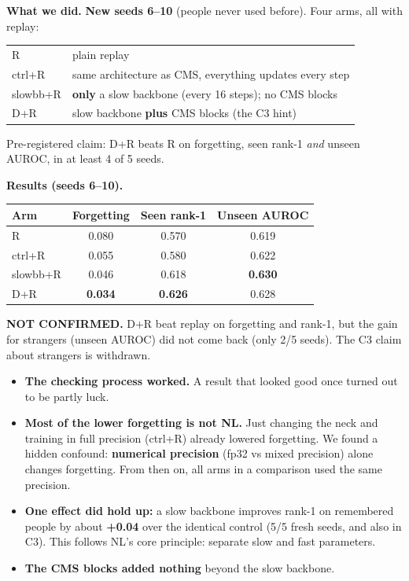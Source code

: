 \documentclass[11pt,a4paper]{article}
\begin{document}
\textbf{What we did.} \textbf{New seeds 6--10} (people never used before). Four arms, all with replay:
\begin{center}
\begin{tabular}{@{}ll@{}}
\toprule
R & plain replay\\
ctrl+R & same architecture as CMS, everything updates every step\\
slowbb+R & \textbf{only} a slow backbone (every 16 steps); no CMS blocks\\
D+R & slow backbone \textbf{plus} CMS blocks (the C3 hint)\\
\bottomrule
\end{tabular}
\end{center}
Pre-registered claim: D+R beats R on forgetting, seen rank-1 \emph{and} unseen AUROC, in at least 4 of 5 seeds.

\textbf{Results (seeds 6--10).}
\begin{center}
\begin{tabular}{@{}lccc@{}}
\toprule
\textbf{Arm} & \textbf{Forgetting} & \textbf{Seen rank-1} & \textbf{Unseen AUROC}\\
\midrule
R & 0.080 & 0.570 & 0.619\\
ctrl+R & 0.055 & 0.580 & 0.622\\
slowbb+R & 0.046 & 0.618 & \textbf{0.630}\\
D+R & \textbf{0.034} & \textbf{0.626} & 0.628\\
\bottomrule
\end{tabular}
\end{center}

\begin{verdict}
\textbf{NOT CONFIRMED.} D+R beat replay on forgetting and rank-1, but the gain for strangers (unseen AUROC) did not come back (only 2/5 seeds). The C3 claim about strangers is withdrawn.
\end{verdict}

\begin{means}
\begin{itemize}[leftmargin=1.2em]
  \item \textbf{The checking process worked.} A result that looked good once turned out to be partly luck.
  \item \textbf{Most of the lower forgetting is not NL.} Just changing the neck and training in full precision (ctrl+R) already lowered forgetting. We found a hidden confound: \textbf{numerical precision} (fp32 vs mixed precision) alone changes forgetting. From then on, all arms in a comparison used the same precision.
  \item \textbf{One effect did hold up:} a slow backbone improves rank-1 on remembered people by about \textbf{+0.04} over the identical control (5/5 fresh seeds, and also in C3). This follows NL's core principle: separate slow and fast parameters.
  \item \textbf{The CMS blocks added nothing} beyond the slow backbone.
\end{itemize}
\end{means}
\end{document}
